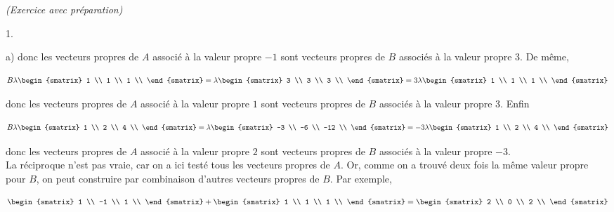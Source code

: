\documentclass[11pt]{article}%
\begin{document}
\begin{exercice}{\it (Exercice avec préparation)}
\begin{noliste}{1.}
\begin{noliste}{a)}
 donc les vecteurs propres de $A$ associé à la valeur propre $-1$ sont
vecteurs propres de $B$ associés à la valeur propre 3. De même,
 
\[
 B \lambda \begin{smatrix}
1 \\
1 \\
1 \\
\end{smatrix}
 = \lambda \begin{smatrix}
3 \\
3 \\
3 \\
\end{smatrix}
 = 3 \lambda \begin{smatrix}
1 \\
1 \\
1 \\
\end{smatrix}
\]

 donc les vecteurs propres de $A$ associé à la valeur propre $1$ sont
vecteurs propres de $B$ associés à la valeur propre 3. Enfin
 
\[
 B \lambda \begin{smatrix}
1 \\
2 \\
4 \\
\end{smatrix}
 = \lambda \begin{smatrix}
-3 \\
-6 \\
-12 \\
\end{smatrix}
 = -3 \lambda \begin{smatrix}
1 \\
2 \\
4 \\
\end{smatrix}
\]

 donc les vecteurs propres de $A$ associé à la valeur propre $2$ sont
vecteurs propres de $B$ associés à la valeur propre $-3$. \\

 La réciproque n'est pas vraie, car on a ici testé tous les vecteurs
propres de $A$. Or, comme on a trouvé deux fois la même valeur propre
pour $B$, on peut construire par combinaison d'autres vecteurs propres
de $B$. Par exemple,
 
\[
 \begin{smatrix}
1 \\
-1 \\
1 \\
\end{smatrix}
 + \begin{smatrix}
1 \\
1 \\
1 \\
\end{smatrix}
 = \begin{smatrix}
2 \\
0 \\
2 \\
\end{smatrix}
\]


\end{noliste}
\end{noliste}
\end{exercice}
\end{document}
